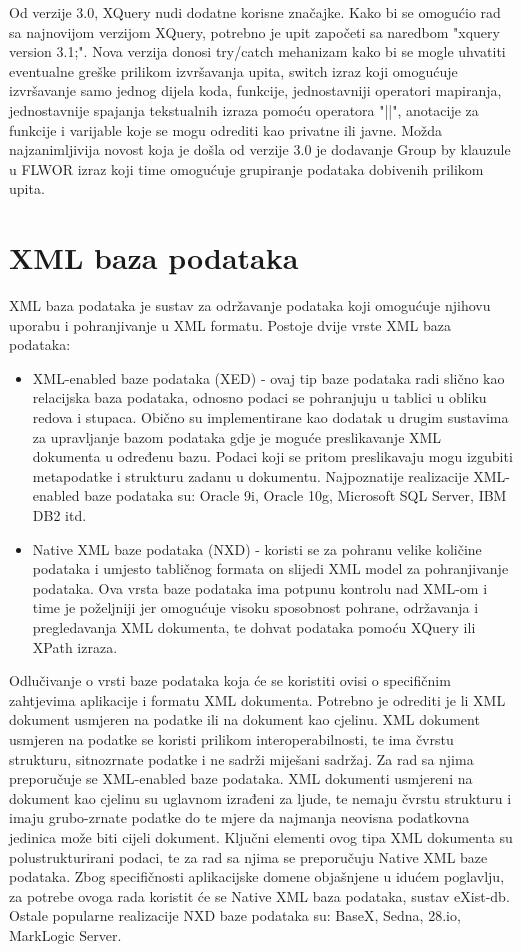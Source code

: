 \documentclass{foi}
\begin{document}
Od verzije 3.0, XQuery nudi dodatne korisne značajke. Kako bi se omogućio rad sa najnovijom verzijom XQuery, potrebno je upit započeti sa naredbom "xquery version 3.1;". Nova verzija donosi try/catch mehanizam kako bi se mogle uhvatiti eventualne greške prilikom izvršavanja upita, switch izraz koji omogućuje izvršavanje samo jednog dijela koda, funkcije, jednostavniji operatori mapiranja, jednostavnije spajanja tekstualnih izraza pomoću operatora "||", anotacije za funkcije i varijable koje se mogu odrediti kao privatne ili javne. Možda najzanimljivija novost koja je došla od verzije 3.0 je dodavanje Group by klauzule u FLWOR izraz koji time omogućuje grupiranje podataka dobivenih prilikom upita. \cite{exist}

\chapter{XML baza podataka}

XML baza podataka je sustav za održavanje podataka koji omogućuje njihovu uporabu i pohranjivanje u XML formatu. Postoje dvije vrste XML baza podataka:
\begin{itemize}
\item XML-enabled baze podataka (XED) - ovaj tip baze podataka radi slično kao relacijska baza podataka, odnosno podaci se pohranjuju u tablici u obliku redova i stupaca. Obično su implementirane kao dodatak u drugim sustavima za upravljanje bazom podataka gdje je moguće preslikavanje XML dokumenta u određenu bazu. Podaci koji se pritom preslikavaju mogu izgubiti metapodatke i strukturu zadanu u dokumentu. Najpoznatije realizacije XML-enabled baze podataka su: Oracle 9i, Oracle 10g, Microsoft SQL Server, IBM DB2 itd.
\item Native XML baze podataka (NXD) - koristi se za pohranu velike količine podataka i umjesto tabličnog formata on slijedi XML model za pohranjivanje podataka. Ova vrsta baze podataka ima potpunu kontrolu nad XML-om i time je poželjniji jer omogućuje visoku sposobnost pohrane, održavanja i pregledavanja XML dokumenta, te dohvat podataka pomoću XQuery ili XPath izraza.
\end{itemize}

Odlučivanje o vrsti baze podataka koja će se koristiti ovisi o specifičnim zahtjevima aplikacije i formatu XML dokumenta. Potrebno je odrediti je li XML dokument usmjeren na podatke ili na dokument kao cjelinu. XML dokument usmjeren na podatke se koristi prilikom interoperabilnosti, te ima čvrstu strukturu, sitnozrnate podatke i ne sadrži miješani sadržaj. Za rad sa njima preporučuje se XML-enabled baze podataka. XML dokumenti usmjereni na dokument kao cjelinu su uglavnom izrađeni za ljude, te nemaju čvrstu strukturu i imaju grubo-zrnate podatke do te mjere da najmanja neovisna podatkovna jedinica može biti cijeli dokument. Ključni elementi ovog tipa XML dokumenta su polustrukturirani podaci, te za rad sa njima se preporučuju Native XML baze podataka. \cite{xmlDatabase} Zbog specifičnosti aplikacijske domene objašnjene u idućem poglavlju, za potrebe ovoga rada koristit će se Native XML baza podataka, sustav eXist-db. Ostale popularne realizacije NXD baze podataka su: BaseX, Sedna, 28.io, MarkLogic Server.
\end{document}
